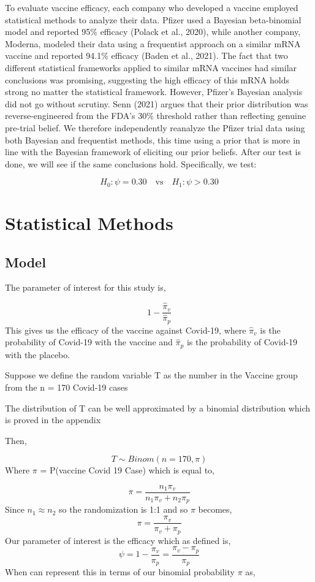 \documentclass[
  11pt,
]{article}
\begin{document}
To evaluate vaccine efficacy, each company who developed a vaccine
employed statistical methods to analyze their data. Pfizer used a
Bayesian beta-binomial model and reported 95\% efficacy (Polack et al.,
2020), while another company, Moderna, modeled their data using a
frequentist approach on a similar mRNA vaccine and reported 94.1\%
efficacy (Baden et al., 2021). The fact that two different statistical
frameworks applied to similar mRNA vaccines had similar conclusions was
promising, suggesting the high efficacy of this mRNA holds strong no
matter the statistical framework. However, Pfizer's Bayesian analysis
did not go without scrutiny. Senn (2021) argues that their prior
distribution was reverse-engineered from the FDA's 30\% threshold rather
than reflecting genuine pre-trial belief. We therefore independently
reanalyze the Pfizer trial data using both Bayesian and frequentist
methods, this time using a prior that is more in line with the Bayesian
framework of eliciting our prior beliefs. After our test is done, we
will see if the same conclusions hold. Specifically, we test:

\[H_0: \psi = 0.30 \quad \text{vs} \quad H_1: \psi > 0.30\]

\section{Statistical Methods}\label{statistical-methods}

\subsection{Model}\label{model}

The parameter of interest for this study is,

\[1 - \frac{ \hat \pi_v}{ \hat \pi_p}\] This gives us the efficacy of
the vaccine against Covid-19, where \(\hat \pi_v\) is the probability of
Covid-19 with the vaccine and \(\hat \pi_p\) is the probability of
Covid-19 with the placebo.

Suppose we define the random variable T as the number in the Vaccine
group from the n = 170 Covid-19 cases

The distribution of T can be well approximated by a binomial
distribution which is proved in the appendix

Then,

\[T \sim Binom(n = 170, \pi) \] Where \(\pi\) = P(vaccine \textbar{}
Covid 19 Case) which is equal to,

\[ \pi = \frac{n_1\pi_v}{n_1\pi_v + n_2\pi_p}\] Since
\(n_1 \approx n_2\) so the randomization is 1:1 and so \(\pi\) becomes,
\[\pi  = \frac{\pi_v}{\pi_v + \pi_p}\] Our parameter of interest is the
efficacy which as defined is,
\[ \psi = 1 - \frac{ \pi_v}{  \pi_p} = \frac{\pi_v -\pi_p }{\pi_p}\]
When can represent this in terms of our binomial probability \(\pi\) as,
\end{document}
